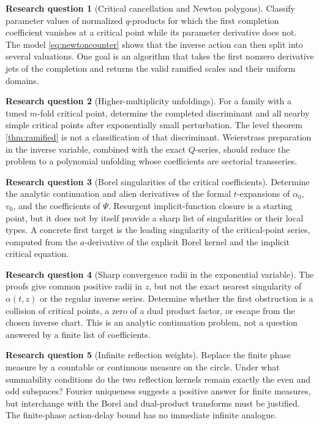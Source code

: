 \documentclass[11pt,a4paper]{article}
\numberwithin{equation}{section}
\theoremstyle{definition}
\newtheorem{problem}{Research question}
\theoremstyle{remark}
\begin{document}
\begin{problem}[Critical cancellation and Newton polygons]
Classify parameter values of normalized $q$-products for which the
first completion coefficient vanishes at a critical point while its
parameter derivative does not. The model \eqref{eq:newtoncounter}
shows that the inverse action can then split into several valuations.
One goal is an algorithm that takes the first nonzero derivative jets
of the completion and returns the valid ramified scales and their
uniform domains.
\end{problem}

\begin{problem}[Higher-multiplicity unfoldings]
For a family with a tuned $m$-fold critical point, determine the
completed discriminant and all nearby simple critical points after
exponentially small perturbation. The level theorem
\cref{thm:ramified} is not a classification of that discriminant.
Weierstrass preparation in the inverse variable, combined with the
exact $Q$-series, should reduce the problem to a polynomial unfolding
whose coefficients are sectorial transseries.
\end{problem}

\begin{problem}[Borel singularities of the critical coefficients]
Determine the analytic continuation and alien derivatives of the
formal $t$-expansions of $\alpha_0$, $v_0$, and the coefficients of
$\Psi$. Resurgent implicit-function closure is a starting point, but
it does not by itself provide a sharp list of singularities or their
local types. A concrete first target is the leading singularity of
the critical-point series, computed from the $a$-derivative of the
explicit Borel kernel and the implicit critical equation.
\end{problem}

\begin{problem}[Sharp convergence radii in the exponential variable]
The proofs give common positive radii in $z$, but not the exact
nearest singularity of $\alpha(t,z)$ or the regular inverse series.
Determine whether the first obstruction is a collision of critical
points, a zero of a dual product factor, or escape from the chosen
inverse chart. This is an analytic continuation problem, not a
question answered by a finite list of coefficients.
\end{problem}

\begin{problem}[Infinite reflection weights]
Replace the finite phase measure by a countable or continuous measure
on the circle. Under what summability conditions do the two reflection
kernels remain exactly the even and odd subspaces? Fourier uniqueness
suggests a positive answer for finite measures, but interchange with
the Borel and dual-product transforms must be justified. The
finite-phase action-delay bound has no immediate infinite analogue.
\end{problem}
\end{document}
